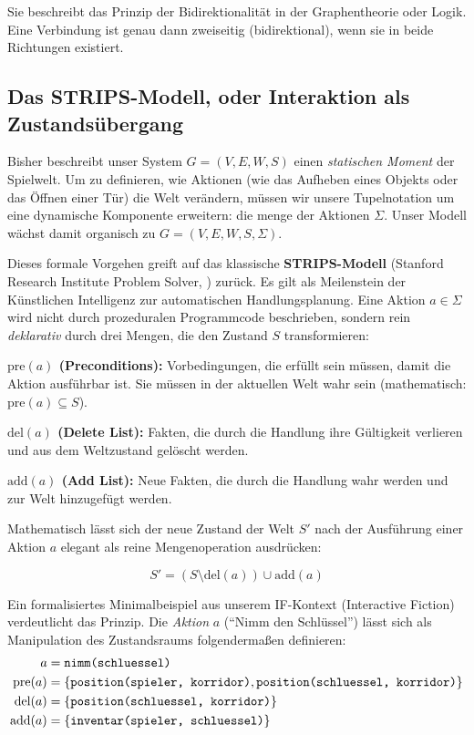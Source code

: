 \documentclass[parskip=half,a4paper,11pt]{scrreprt}
\begin{document}
Sie beschreibt das Prinzip der Bidirektionalität in der Graphentheorie oder Logik. Eine Verbindung ist genau dann zweiseitig (bidirektional), wenn sie in beide Richtungen existiert.

\subsection{Das STRIPS-Modell, oder Interaktion als Zustandsübergang}

Bisher beschreibt unser System $G=(V,E,W,S)$ einen \textit{statischen Moment} der Spielwelt. Um zu definieren, wie Aktionen (wie das Aufheben eines Objekts oder das Öffnen einer Tür) die Welt verändern, müssen wir unsere Tupelnotation um eine dynamische Komponente erweitern: die menge der Aktionen $\Sigma$. Unser Modell wächst damit organisch zu $G=(V,E,W,S,\Sigma)$.

Dieses formale Vorgehen greift auf das klassische \textbf{STRIPS-Modell} (Stanford Research Institute Problem Solver, \citealp{Fikes1971}) zurück. Es gilt als Meilenstein der Künstlichen Intelligenz zur automatischen Handlungsplanung. Eine Aktion $a \in \Sigma$ wird nicht durch prozeduralen Programmcode beschrieben, sondern rein \textit{deklarativ} durch drei Mengen, die den Zustand $S$ transformieren:

\textbf{$\text{pre}(a)$ (Preconditions):} Vorbedingungen, die erfüllt sein müssen, damit die Aktion ausführbar ist. Sie müssen in der aktuellen Welt wahr sein (mathematisch: $\text{pre}(a) \subseteq S$).

\textbf{$\text{del}(a)$ (Delete List):} Fakten, die durch die Handlung ihre Gültigkeit verlieren und aus dem Weltzustand gelöscht werden.

\textbf{$\text{add}(a)$ (Add List):} Neue Fakten, die durch die Handlung wahr werden und zur Welt hinzugefügt werden.

Mathematisch lässt sich der neue Zustand der Welt $S'$ nach der Ausführung einer Aktion $a$ elegant als reine Mengenoperation ausdrücken:

\begin{equation}
S' = (S \setminus \text{del}(a)) \cup \text{add}(a)
\end{equation}

Ein formalisiertes Minimalbeispiel aus unserem IF-Kontext (Interactive Fiction) verdeutlicht das Prinzip. Die \textit{Aktion} $a$ (\enquote{Nimm den Schlüssel}) lässt sich als Manipulation des Zustandsraums folgendermaßen definieren:
\begin{align*}
    a &= \text{\texttt{nimm(schluessel)}} \\
    \text{pre}(a) &= \{ \text{\texttt{position(spieler, korridor)}}, \text{\texttt{position(schluessel, korridor)}} \} \\
    \text{del}(a) &= \{ \text{\texttt{position(schluessel, korridor)}} \} \\
    \text{add}(a) &= \{ \text{\texttt{inventar(spieler, schluessel)}} \}
\end{align*}
\end{document}
